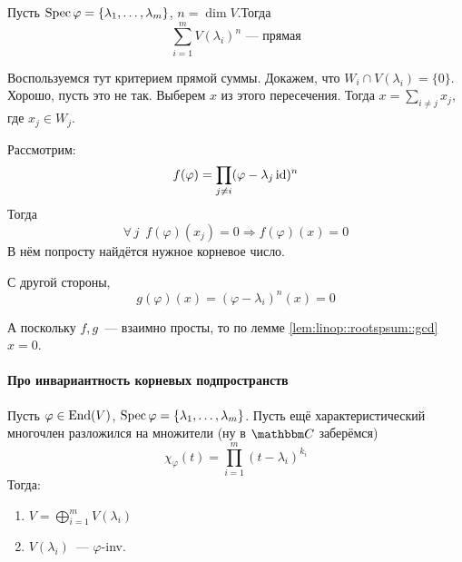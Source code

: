 \documentclass[12pt]{../../../notes}
\begin{document}
\begin{thrm}\label{thrm:linop::rootspsum}
  Пусть $\operatorname{Spec} \varphi = \{\lambda_1, \dotsc , \lambda_m\}$, $n = \dim V$.Тогда 
  \[
    \sum_{i=1}^{m} V(\lambda_i)^n\text{~--- прямая}
  \]
\end{thrm}
\begin{ittproof}
  Воспользуемся тут критерием прямой суммы. Докажем, что $W_i \cap V(\lambda_i) = \{0\}$.
  Хорошо, пусть это не так. Выберем $x$ из этого пересечения. Тогда $x= \sum_{i\neq j} x_j$,
  где $x_j \in W_j$.

  Рассмотрим:
  \begin{align*}
    f(\varphi) = \prod_{j\neq i} (\varphi -\lambda_j \operatorname{id})^n
  \end{align*}
  Тогда 
  \[
    \forall\, j \;\: f(\varphi)(x_j) = 0 \Rightarrow f(\varphi)(x) = 0
  \]
  В нём попросту найдётся нужное корневое число. 
  
  С другой стороны, \[
    g(\varphi)(x) = (\varphi - \lambda_i)^n(x) = 0
  \]

  А поскольку $f, g$~--- взаимно просты, то по лемме \ref{lem:linop::rootspsum::gcd} $x=0$.
\end{ittproof}
\paragraph{Про инвариантность корневых подпространств}
\begin{thrm}\label{thrm:linop::rootspinv}
  Пусть $\varphi \in \operatorname{End} (V)$, $\operatorname{Spec} \varphi = \{\lambda_1, \dotsc , \lambda_m\}$.
  Пусть ещё характеристический многочлен разложился на множители (ну в $\C$ заберёмся)
  \[
    \chi_\varphi(t) = \prod_{i=1}^m (t-\lambda_i)^{k_i}
  \]
  Тогда:
  \begin{enumerate}
    \item $\displaystyle V = \bigoplus\limits_{i=1}^m V(\lambda_i)$
    \item $\displaystyle V(\lambda_i)$~--- $\varphi$-inv.
  \end{enumerate}
\end{thrm}
\end{document}
